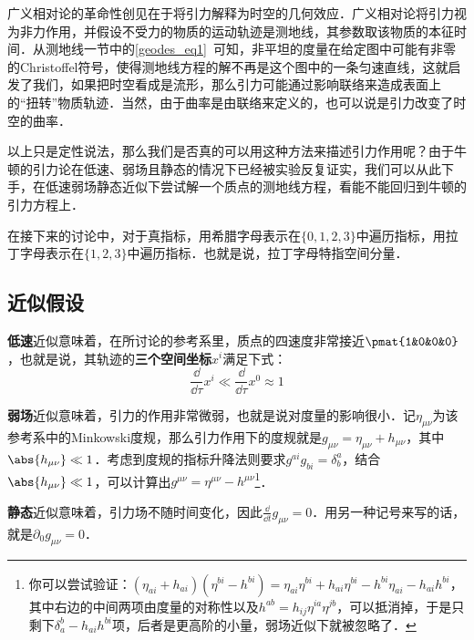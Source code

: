 

广义相对论的革命性创见在于将引力解释为时空的几何效应．广义相对论将引力视为非力作用，并假设不受力的物质的运动轨迹是测地线，其参数取该物质的本征时间．从测地线一节中的\autoref{geodes_eq1}~可知，非平坦的度量在给定图中可能有非零的Christoffel符号，使得测地线方程的解不再是这个图中的一条匀速直线，这就启发了我们，如果把时空看成是流形，那么引力可能通过影响联络来造成表面上的“扭转”物质轨迹．当然，由于曲率是由联络来定义的，也可以说是引力改变了时空的曲率．

以上只是定性说法，那么我们是否真的可以用这种方法来描述引力作用呢？由于牛顿的引力论在低速、弱场且静态的情况下已经被实验反复证实，我们可以从此下手，在低速弱场静态近似下尝试解一个质点的测地线方程，看能不能回归到牛顿的引力方程上．

在接下来的讨论中，对于真指标，用希腊字母表示在$\{0, 1, 2, 3\}$中遍历指标，用拉丁字母表示在$\{1, 2, 3\}$中遍历指标．也就是说，拉丁字母特指空间分量．

\subsection{近似假设}

\textbf{低速}近似意味着，在所讨论的参考系里，质点的四速度非常接近$\pmat{1&0&0&0}$，也就是说，其轨迹的\textbf{三个空间坐标}$x^i$满足下式：
\begin{equation}\label{WeakG_eq1}
\frac{\dd}{\dd \tau}x^i\ll \frac{\dd}{\dd \tau}x^0\approx 1
\end{equation}

\textbf{弱场}近似意味着，引力的作用非常微弱，也就是说对度量的影响很小．记$\eta_{\mu\nu}$为该参考系中的Minkowski度规，那么引力作用下的度规就是$g_{\mu\nu}=\eta_{\mu\nu}+h_{\mu\nu}$，其中$\abs{h_{\mu\nu}}\ll 1$．考虑到度规的指标升降法则要求$g^{ai}g_{bi}=\delta^a_b$，结合$\abs{h_{\mu\nu}}\ll 1$，可以计算出$g^{\mu\nu}=\eta^{\mu\nu}-h^{\mu\nu}$\footnote{你可以尝试验证：$(\eta_{ai}+h_{ai})(\eta^{bi}-h^{bi})=\eta_{ai}\eta^{bi}+h_{ai}\eta^{bi}-h^{bi}\eta_{ai}-h_{ai}h^{bi}$，其中右边的中间两项由度量的对称性以及$h^{ab}=h_{ij}\eta^{ia}\eta^{jb}$，可以抵消掉，于是只剩下$\delta^b_a-h_{ai}h^{bi}$项，后者是更高阶的小量，弱场近似下就被忽略了．}．

\textbf{静态}近似意味着，引力场不随时间变化，因此$\frac{\dd}{\dd t}g_{\mu\nu}=0$．用另一种记号来写的话，就是$\partial_0g_{\mu\nu}=0$．

